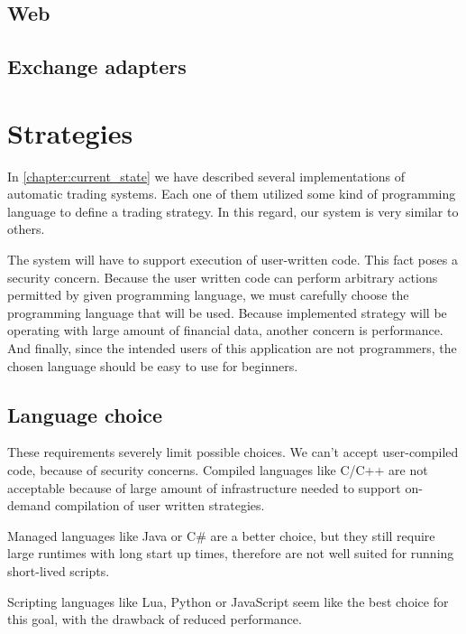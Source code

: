 \subsection{Web}


\subsection{Exchange adapters}

\section{Strategies}
In \autoref{chapter:current_state} we have described several implementations of automatic trading systems. Each one of them
utilized some kind of programming language to define a trading strategy. In this regard, our system is very similar to others.

The system will have to support execution of user-written code. This fact poses a security concern. Because the user
written code can perform arbitrary actions permitted by given programming language, we must carefully choose the programming
language that will be used. Because implemented strategy will be operating with large amount of financial data, another
concern is performance. And finally, since the intended users of this application are not programmers, the chosen language
should be easy to use for beginners.

\subsection{Language choice}
These requirements severely limit possible choices. We can't accept user-compiled code, because of security concerns.
Compiled languages like C/C++ are not acceptable because of large amount of infrastructure needed to support
on-demand compilation of user written strategies.

Managed languages like Java or C\# are a better choice, but they still require large runtimes with long start up times, therefore
are not well suited for running short-lived scripts.

Scripting languages like Lua, Python or JavaScript seem like the best choice for this goal, with the drawback of
reduced performance.

